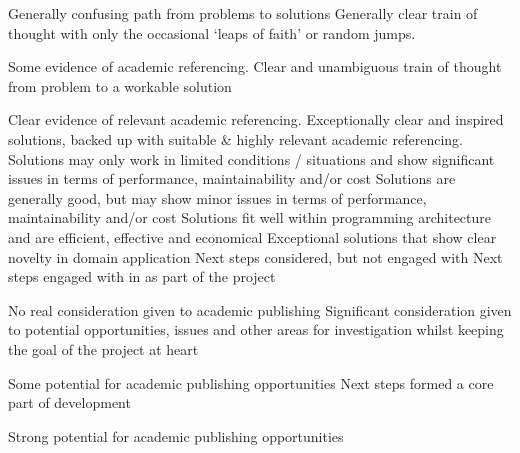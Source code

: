 \documentclass{../common/fal_assignment}
\begin{document}
\begin{markingrubric}
%
        \grade \fail Generally confusing path from problems to solutions
        \grade Generally clear train of thought with only the occasional ‘leaps of faith’ or random jumps.
            \par Some evidence of academic referencing.
        \grade Clear and unambiguous train of thought from problem to a workable solution
            \par Clear evidence of relevant academic referencing.
        \grade Exceptionally clear and inspired solutions, backed up with suitable \& highly relevant academic referencing.
%
        \grade \fail Solutions may only work in limited conditions / situations and show significant issues in terms of performance, maintainability and/or cost
        \grade Solutions are generally good, but may show minor issues in terms of performance, maintainability and/or cost
        \grade Solutions fit well within programming architecture and are efficient, effective and economical
        \grade Exceptional solutions that show clear novelty in domain application
%
        \grade \fail Next steps considered, but not engaged with
        \grade Next steps engaged with in as part of the project
            \par No real consideration given to academic publishing
        \grade Significant consideration given to potential opportunities, issues and other areas for investigation whilst keeping the goal of the project at heart
            \par Some potential for academic publishing opportunities
        \grade Next steps formed a core part of development
            \par Strong potential for academic publishing opportunities
\end{markingrubric}
\end{document}
